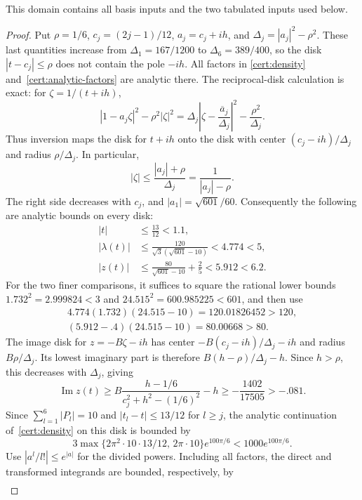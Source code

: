 This domain contains all basis inputs and the two tabulated inputs used below.

\begin{proof}
Put $\rho=1/6$, $c_j=(2j-1)/12$, $a_j=c_j+ih$, and
$\Delta_j=|a_j|^2-\rho^2$.  These last quantities increase from
$\Delta_1=167/1200$ to $\Delta_6=389/400$, so the disk
$|t-c_j|\le\rho$ does not contain the pole $-ih$.  All factors in
\eqref{cert:density} and~\eqref{cert:analytic-factors} are analytic there.
The reciprocal-disk calculation is exact: for $\zeta=1/(t+ih)$,
\[
 |1-a_j\zeta|^2-\rho^2|\zeta|^2
 =\Delta_j\left|\zeta-\frac{\overline a_j}{\Delta_j}\right|^2
   -\frac{\rho^2}{\Delta_j}.
\]
Thus inversion maps the disk for $t+ih$ onto the disk with center
$(c_j-ih)/\Delta_j$ and radius $\rho/\Delta_j$.  In particular,
\[
 |\zeta|\le\frac{|a_j|+\rho}{\Delta_j}
       =\frac1{|a_j|-\rho}.
\]
The right side decreases with $c_j$, and $|a_1|=\sqrt{601}/60$.
Consequently the following are analytic bounds on every disk:
\[
\begin{aligned}
 |t|&\le\frac{13}{12}<1.1,\\
 |\lambda(t)|&\le\frac{120}{\sqrt3(\sqrt{601}-10)}<4.774<5,\\
 |z(t)|&\le\frac{80}{\sqrt{601}-10}+\frac25<5.912<6.2.
\end{aligned}
\]
For the two finer comparisons, it suffices to square the rational lower
bounds $1.732^2=2.999824<3$ and $24.515^2=600.985225<601$, and then use
\[
\begin{gathered}
 4.774(1.732)(24.515-10)=120.01826452>120,\\
 (5.912-.4)(24.515-10)=80.00668>80.
\end{gathered}
\]
The image disk for $z=-B\zeta-ih$ has center
$-B(c_j-ih)/\Delta_j-ih$ and radius $B\rho/\Delta_j$.  Its lowest
imaginary part is therefore $B(h-\rho)/\Delta_j-h$.  Since $h>\rho$,
this decreases with $\Delta_j$, giving
\begin{equation}\label{cert:disk-imaginary}
 \operatorname{Im}z(t)\ge
 B\frac{h-1/6}{c_j^2+h^2-(1/6)^2}-h
 \ge-\frac{1402}{17505}>-.081.
\end{equation}
Since $\sum_{l=1}^6|P_l|=10$ and $|t_l-t|\le13/12$ for $l\ge j$,
the analytic continuation of~\eqref{cert:density} on this disk is bounded
by
\[
 3\max\{2\pi^2\cdot10\cdot13/12,\,2\pi\cdot10\}
       e^{100\pi/6}<1000e^{100\pi/6}.
\]
Use $|a^l/l!|\le e^{|a|}$ for the divided powers.  Including all factors,
the direct and transformed integrands are bounded, respectively, by
\[
\begin{aligned}

\end{aligned}\]
\end{proof}
